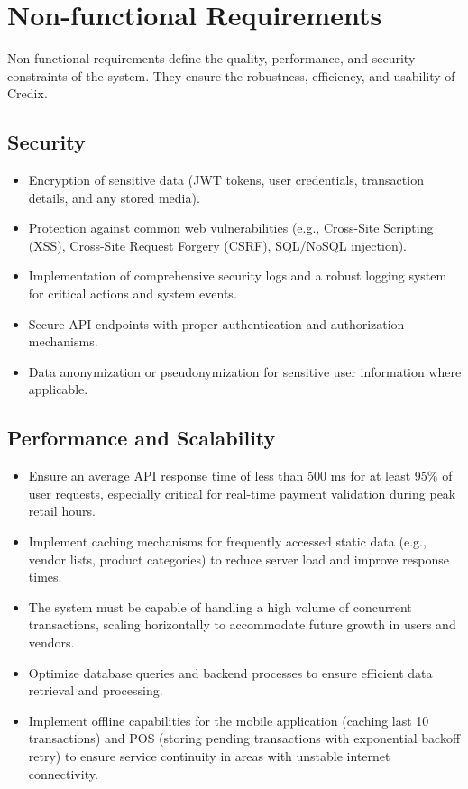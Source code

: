 \section{Non-functional Requirements}

Non-functional requirements define the quality, performance, and security constraints of the system. They ensure the robustness, efficiency, and usability of Credix.

\subsection{Security}
\begin{itemize}
    \item Encryption of sensitive data (JWT tokens, user credentials, transaction details, and any stored media).
    \item Protection against common web vulnerabilities (e.g., Cross-Site Scripting (XSS), Cross-Site Request Forgery (CSRF), SQL/NoSQL injection).
    \item Implementation of comprehensive security logs and a robust logging system for critical actions and system events.
    \item Secure API endpoints with proper authentication and authorization mechanisms.
    \item Data anonymization or pseudonymization for sensitive user information where applicable.
\end{itemize}

\subsection{Performance and Scalability}
\begin{itemize}
    \item Ensure an average API response time of less than 500 ms for at least 95\% of user requests, especially critical for real-time payment validation during peak retail hours.
    \item Implement caching mechanisms for frequently accessed static data (e.g., vendor lists, product categories) to reduce server load and improve response times.
    \item The system must be capable of handling a high volume of concurrent transactions, scaling horizontally to accommodate future growth in users and vendors.
    \item Optimize database queries and backend processes to ensure efficient data retrieval and processing.
    \item Implement offline capabilities for the mobile application (caching last 10 transactions) and POS (storing pending transactions with exponential backoff retry) to ensure service continuity in areas with unstable internet connectivity.
\end{itemize}

